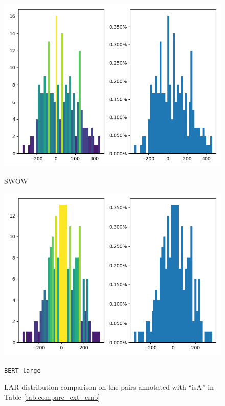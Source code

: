 \documentclass[letterpaper]{article} %
\begin{document}
\begin{figure}[!]
\centering
\begin{minipage}[b]{0.45\textwidth}
    \includegraphics[width=\textwidth]{rel_isa_gtSWOW_bert_large.png}
    \caption*{SWOW}
  \end{minipage}
  \hfill
  \begin{minipage}[b]{0.45\textwidth}
    \includegraphics[width=\textwidth]{rel_isaSWOW_bert_large.png}
    \caption*{\texttt{BERT-large}}
  \end{minipage}
\caption{LAR distribution comparison on the pairs annotated with ``isA'' in Table \ref{tab:compare_cxt_emb} }
\label{fig:compare_lar_isa}
\end{figure}
\end{document}
